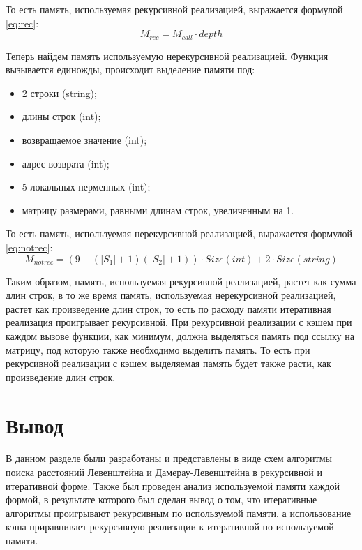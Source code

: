 То есть память, используемая рекурсивной реализацией, выражается формулой
\ref{eq:rec}:
\begin{equation}\label{eq:rec}
    M_{rec} = M_{call} \cdot depth
\end{equation}

Теперь найдем память используемую нерекурсивной реализацией. Функция вызывается
единожды, происходит выделение памяти под:
\begin{itemize}
    \item 2 строки (string);
    \item длины строк (int);
    \item возвращаемое значение (int);
    \item адрес возврата (int);
    \item 5 локальных перменных (int);
    \item матрицу размерами, равными длинам строк, увеличенным на 1.
\end{itemize}

То есть память, используемая нерекурсивной реализацией, выражается формулой
\ref{eq:notrec}:
\begin{equation}\label{eq:notrec}
    M_{notrec} = (9 + (|S_1| + 1)(|S_2| + 1)) \cdot Size(int)
                 + 2 \cdot Size(string)
\end{equation}

Таким образом, память, используемая рекурсивной реализацией, растет как сумма
длин строк, в то же время память, используемая нерекурсивной реализацией,
растет как произведение длин строк, то есть по расходу памяти итеративная
реализация проигрывает рекурсивной. При рекурсивной реализации с кэшем при
каждом вызове функции, как минимум, должна выделяться память под ссылку на
матрицу, под которую также необходимо выделить память. То есть при рекурсивной
реализации с кэшем выделяемая память будет также расти, как произведение длин
строк.

\section{Вывод}

В данном разделе были разработаны и представлены в виде схем алгоритмы поиска
расстояний Левенштейна и Дамерау-Левенштейна в рекурсивной и итеративной форме.
Также был проведен анализ используемой памяти каждой формой, в результате
которого был сделан вывод о том, что итеративные алгоритмы проигрывают
рекурсивным по используемой памяти, а использование кэша приравнивает
рекурсивную реализации к итеративной по используемой памяти.
